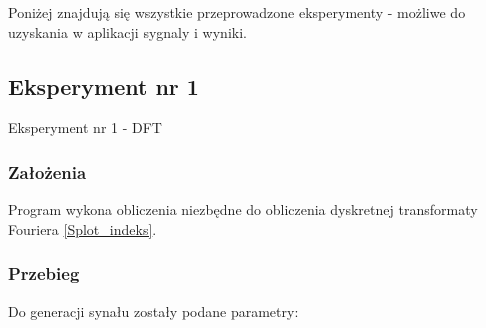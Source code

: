 \documentclass[12pt]{article}
\begin{document}
Poniżej znajdują się wszystkie przeprowadzone eksperymenty - możliwe do uzyskania w aplikacji sygnaly i wyniki. 


\subsection{Eksperyment nr 1}

Eksperyment nr 1 -  DFT\\


\subsubsection{Założenia}
Program wykona obliczenia niezbędne do obliczenia dyskretnej transformaty Fouriera \ref{Splot_indeks}.

\subsubsection{Przebieg}
Do generacji synału zostały podane parametry:
\end{document}
